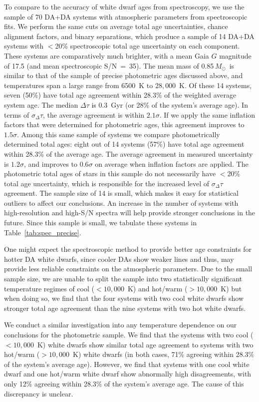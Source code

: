 \documentclass[twocolumn]{aastex631}
\newcommand{\msun}{$M_{\odot}$}
\begin{document}
To compare to the accuracy of white dwarf ages from spectroscopy, we use the sample of 70 DA+DA systems with atmospheric parameters from spectroscopic fits. We perform the same cuts on average total age uncertainties, chance alignment factors, and binary separations, which produce a sample of 14 DA+DA systems with $<$20\% spectroscopic total age uncertainty on each component. These systems are comparatively much brighter, with a mean Gaia $G$ magnitude of 17.5 (and mean spectroscopic S/N~=~35). The mean mass of 0.85\,\msun\ is similar to that of the sample of precise photometric ages discussed above, and temperatures span a large range from 6500~K to $28{,}000$~K. Of these 14 systems, seven (50\%) have total age agreement within 28.3\% of the weighted average system age. The median $\Delta \tau$ is 0.3~Gyr (or 28\% of the system's average age). In terms of $\sigma_\Delta\tau$, the average agreement is within $2.1\sigma$. If we apply the same inflation factors that were determined for photometric ages, this agreement improves to $1.5\sigma$. Among this same sample of systems we compare photometrically determined total ages: eight out of 14 systems (57\%) have total age agreement within 28.3\% of the average age. The average agreement in measured uncertainty is $1.2\sigma$, and improves to $0.6\sigma$ on average when inflation factors are applied. The photometric total ages of stars in this sample do not necessarily have $<$20\% total age uncertainty, which is responsible for the increased level of $\sigma_\Delta\tau$ agreement. The sample size of 14 is small, which makes it easy for statistical outliers to affect our conclusions. An increase in the number of systems with high-resolution and high-S/N spectra will help provide stronger conclusions in the future. Since this sample is small, we tabulate these systems in Table~\ref{tab:spec_precise}.

One might expect the spectroscopic method to provide better age constraints for hotter DA white dwarfs, since cooler DAs show weaker lines and thus, may provide less reliable constraints on the atmospheric parameters. Due to the small sample size, we are unable to split the sample into two statistically significant temperature regimes of cool ($<$$10{,}000$~K) and hot/warm ($>$$10{,}000$~K) but when doing so, we find that the four systems with two cool white dwarfs show stronger total age agreement than the nine systems with two hot white dwarfs.

We conduct a similar investigation into any temperature dependence on our conclusions for the photometric sample. We find that the systems with two cool ($<$$10{,}000$~K) white dwarfs show similar total age agreement to systems with two hot/warm ($>$$10{,}000$~K) white dwarfs (in both cases, 71\% agreeing within 28.3\% of the system's average age). However, we find that systems with one cool white dwarf and one hot/warm white dwarf show abnormally high disagreements, with only 12\% agreeing within 28.3\% of the system's average age. The cause of this discrepancy is unclear.
\end{document}
